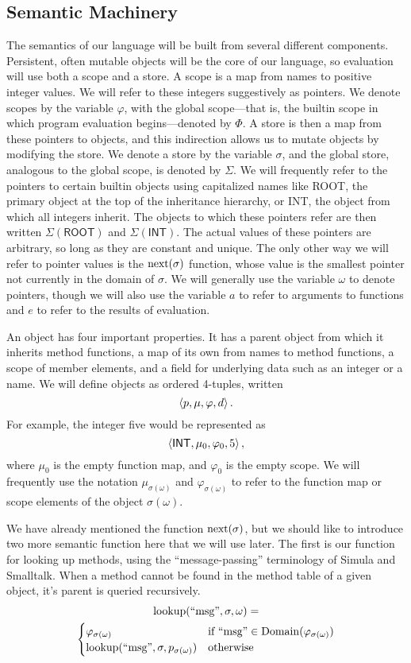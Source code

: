 \documentclass[twocolumn]{article}
\begin{document}
\subsection*{Semantic Machinery}
The semantics of our language will be built from several different
components. Persistent, often mutable objects will be the core of our
language, so evaluation will use both a scope and a store. A scope is
a map from names to positive integer values. We will refer to these
integers suggestively as pointers. We denote scopes by the variable
$\varphi$, with the global scope---that is, the builtin scope in which
program evaluation begins---denoted by $\Phi$. A store is then a map
from these pointers to objects, and this indirection allows us to
mutate objects by modifying the store. We denote a store by the
variable $\sigma$, and the global store, analogous to the global
scope, is denoted by $\Sigma$. We will frequently refer to the
pointers to certain builtin objects using capitalized names like
\textsf{ROOT}, the primary object at the top of the inheritance
hierarchy, or \textsf{INT}, the object from which all integers
inherit. The objects to which these pointers refer are then written
$\Sigma(\mathsf{ROOT})$ and $\Sigma(\mathsf{INT})$. The actual values
of these pointers are arbitrary, so long as they are constant and
unique. The only other way we will refer to pointer values is the
$\operatorname{next}(\sigma)$ function, whose value is the smallest pointer not
currently in the domain of $\sigma$. We will generally use the
variable $\omega$ to denote pointers, though we will also use the
variable $a$ to refer to arguments to functions and $e$ to refer to
the results of evaluation.

An object has four important properties. It has a parent object from
which it inherits method functions, a map of its own from names to
method functions, a scope of member elements, and a field for
underlying data such as an integer or a name. We will define objects
as ordered 4-tuples, written
\[ \left< p, \mu, \varphi, d \right> .\]
For example, the integer five would be represented as
\[ \left< \mathsf{INT}, \mu_0, \varphi_0, 5 \right>, \]
where $\mu_0$ is the empty function map, and $\varphi_0$ is the empty
scope. We will frequently use the notation $\mu_{\sigma(\omega)}$ and
$\varphi_{\sigma(\omega)}$ to refer to the function map or scope
elements of the object $\sigma(\omega)$.

We have already mentioned the function $\operatorname{next}(\sigma)$, but we should
like to introduce two more semantic function here that we will use
later. The first is our function for looking up methods, using the
``message-passing'' terminology of Simula and Smalltalk. When a method
cannot be found in the method table of a given object, it's parent is
queried recursively.
\begin{multline*} \operatorname{lookup}(\text{``msg''}, \sigma, \omega) = \\
\begin{cases}
  \varphi_{\sigma(\omega)} &\text{if } \text{``msg''} \in
  \operatorname{Domain}(\varphi_{\sigma(\omega)}) \\
    \operatorname{lookup}(\text{``msg''},\sigma,p_{\sigma(\omega)}) &\text{otherwise}
  \end{cases}
\end{multline*}
\end{document}
